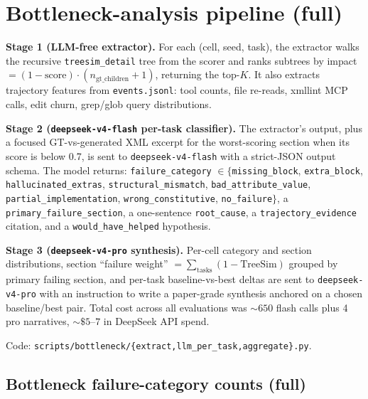 \documentclass{article}
\begin{document}
\section{Bottleneck-analysis pipeline (full)}
\label{app:bottleneck}

\textbf{Stage 1 (LLM-free extractor).} For each (cell, seed, task), the extractor walks the recursive \texttt{treesim\_detail} tree from the scorer and ranks subtrees by impact $= (1 - \mathrm{score}) \cdot (n_{\mathrm{gt\_children}} + 1)$, returning the top-$K$. It also extracts trajectory features from \texttt{events.jsonl}: tool counts, file re-reads, xmllint MCP calls, edit churn, grep/glob query distributions.

\textbf{Stage 2 (\texttt{deepseek-v4-flash} per-task classifier).} The extractor's output, plus a focused GT-vs-generated XML excerpt for the worst-scoring section when its score is below 0.7, is sent to \texttt{deepseek-v4-flash} with a strict-JSON output schema. The model returns: \texttt{failure\_category} $\in \{$\texttt{missing\_block}, \texttt{extra\_block}, \texttt{hallucinated\_extras}, \texttt{structural\_mismatch}, \texttt{bad\_attribute\_value}, \texttt{partial\_implementation}, \texttt{wrong\_constitutive}, \texttt{no\_failure}$\}$, a \texttt{primary\_failure\_section}, a one-sentence \texttt{root\_cause}, a \texttt{trajectory\_evidence} citation, and a \texttt{would\_have\_helped} hypothesis.

\textbf{Stage 3 (\texttt{deepseek-v4-pro} synthesis).} Per-cell category and section distributions, section ``failure weight'' $= \sum_{\mathrm{tasks}}(1 - \mathrm{TreeSim})$ grouped by primary failing section, and per-task baseline-vs-best deltas are sent to \texttt{deepseek-v4-pro} with an instruction to write a paper-grade synthesis anchored on a chosen baseline/best pair. Total cost across all evaluations was ${\sim}650$ flash calls plus 4 pro narratives, ${\sim}\$5\text{--}7$ in DeepSeek API spend.

Code: \texttt{scripts/bottleneck/\{extract,llm\_per\_task,aggregate\}.py}.

\subsection{Bottleneck failure-category counts (full)}
\label{app:bottleneck-counts}
\end{document}
